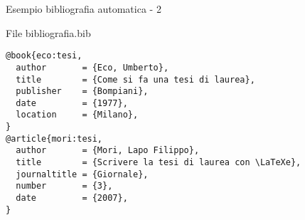 \begin{frame}[fragile]{Esempio bibliografia automatica - 2}

\begin{exampleblock} {File bibliografia.bib}
	\begin{lstlisting}
@book{eco:tesi,
  author       = {Eco, Umberto},
  title        = {Come si fa una tesi di laurea},
  publisher    = {Bompiani},
  date         = {1977},
  location     = {Milano},
}
@article{mori:tesi,
  author       = {Mori, Lapo Filippo},
  title        = {Scrivere la tesi di laurea con \LaTeXe},
  journaltitle = {Giornale},
  number       = {3},
  date         = {2007},
}
	\end{lstlisting}
\end{exampleblock}

\end{frame}